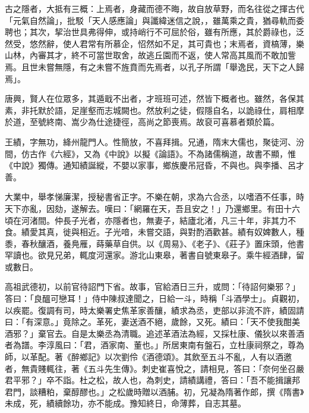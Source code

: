 
\begin{pinyinscope}

 古之隱者，大抵有三概：上焉者，身藏而德不晦，故自放草野，而名往從之揮古代「元氣自然論」，批駁「天人感應論」與讖緯迷信之說，，雖萬乘之貴，猶尋軌而委聘也；其次，挈治世具弗得伸，或持峭行不可屈於俗，雖有所應，其於爵祿也，泛然受，悠然辭，使人君常有所慕企，怊然如不足，其可貴也；末焉者，資槁薄，樂山林，內審其才，終不可當世取舍，故逃丘園而不返，使人常高其風而不敢加訾焉。且世未嘗無隱，有之未嘗不旌賁而先焉者，以孔子所謂「舉逸民，天下之人歸焉」。



 唐興，賢人在位眾多，其遁戢不出者，才班班可述，然皆下概者也。雖然，各保其素，非托默於語，足崖壑而志城闕也。然放利之徒，假隱自名，以詭祿仕，肩相摩於道，至號終南、嵩少為仕途捷徑，高尚之節喪焉。故裒可喜慕者類於篇。



 王績，字無功，絳州龍門人。性簡放，不喜拜揖。兄通，隋末大儒也，聚徒河、汾間，仿古作《六經》，又為《中說》以擬《論語》。不為諸儒稱道，故書不顯，惟《中說》獨傳。通知績誕縱，不嬰以家事，鄉族慶吊冠昏，不與也。與李播、呂才善。



 大業中，舉孝悌廉潔，授秘書省正字。不樂在朝，求為六合丞，以嗜酒不任事，時天下亦亂，因劾，遂解去。嘆曰：「網羅在天，吾且安之！」乃還鄉里。有田十六頃在河渚間。仲長子光者，亦隱者也，無妻子，結廬北渚，凡三十年，非其力不食。績愛其真，徙與相近。子光喑，未嘗交語，與對酌酒歡甚。績有奴婢數人，種黍，春秋釀酒，養鳧雁，蒔藥草自供。以《周易》、《老子》、《莊子》置床頭，他書罕讀也。欲見兄弟，輒度河還家。游北山東皋，著書自號東皋子。乘牛經酒肆，留或數日。



 高祖武德初，以前官待詔門下省。故事，官給酒日三升，或問：「待詔何樂邪？」答曰：「良醞可戀耳！」侍中陳叔達聞之，日給一斗，時稱「斗酒學士」。貞觀初，以疾罷。復調有司，時太樂署史焦革家善釀，績求為丞，吏部以非流不許，績固請曰：「有深意。」竟除之。革死，妻送酒不絕，歲餘，又死。績曰：「天不使我酣美酒邪？」棄官去。自是太樂丞為清職。追述革酒法為經，又採杜康、儀狄以來善酒者為譜。李淳風曰：「君，酒家南、董也。」所居東南有盤石，立杜康祠祭之，尊為師，以革配。著《醉鄉記》以次劉伶《酒德頌》。其飲至五斗不亂，人有以酒邀者，無貴賤輒往，著《五斗先生傳》。刺史崔喜悅之，請相見，答曰：「奈何坐召嚴君平邪？」卒不詣。杜之松，故人也，為刺史，請績講禮，答曰：「吾不能揖讓邦君門，談糟粕，棄醇醪也。」之松歲時贈以酒脯。初，兄凝為隋著作郎，撰《隋書》未成，死，績續餘功，亦不能成。豫知終日，命薄葬，自志其墓。




\end{pinyinscope}
